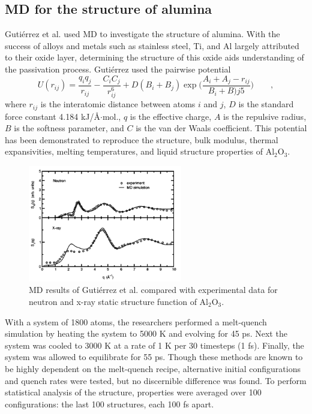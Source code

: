 \documentclass[3p,review,12pt]{elsarticle}
\begin{document}
\subsection{MD for the structure of alumina}
Guti\'errez et al. \cite{Gutierrez2002} used MD to investigate the structure of alumina. With the success of alloys and metals such as stainless steel, Ti, and Al largely attributed to their oxide layer, determining the structure of this oxide aids understanding of the passivation process. Guti\'errez used the pairwise potential
\begin{equation}
U(r_{ij})=\frac{q_{i}q_{j}}{r_{ij}}-\frac{C_{i}C_{j}}{r^{6}_{ij}}+D(B_{i}+B_{j})\exp\bigg(\frac{A_{i}+A_{j}-r_{ij}}{B_{i}+B){j}5}\bigg) \qquad ,
\end{equation}
where $r_{ij}$ is the interatomic distance between atoms $i$ and $j$, $D$ is the standard force constant 4.184 kJ/\AA$\cdot$mol., $q$ is the effective charge, $A$ is the repulsive radius, $B$ is the softness parameter, and $C$ is the van der Waals coefficient. This potential has been demonstrated to reproduce the structure, bulk modulus, thermal expansivities, melting temperatures, and liquid structure properties of Al$_{2}$O$_{3}$.
\begin{figure}[h]
	\includegraphics[width=0.6\textwidth]{gutierrez3}
	\centering
	\caption{MD results of Guti\'errez et al. \cite{Gutierrez2002} compared with experimental data for neutron and x-ray static structure function of Al$_{2}$O$_{3}.$} 
\end{figure}
\par
With a system of 1800 atoms, the researchers performed a melt-quench simulation by heating the system to 5000 K and evolving for 45 ps. Next the system was cooled to 3000 K at a rate of 1 K per 30 timesteps (1 fs). Finally, the system was allowed to equilibrate for 55 ps. Though these methods are known to be highly dependent on the melt-quench recipe, alternative initial configurations and quench rates were tested, but no discernible difference was found.
To perform statistical analysis of the structure, properties were averaged over 100 configurations: the last 100 structures, each 100 fs apart.
\end{document}
